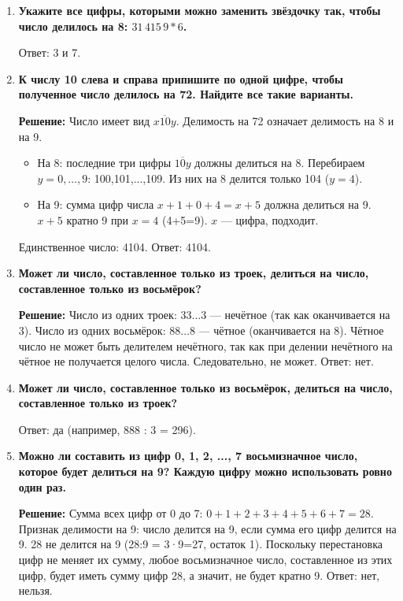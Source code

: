 \documentclass[12pt, a4paper]{article}
\begin{document}
\begin{enumerate}[label=\arabic*., wide=0pt, leftmargin=*]
\item \textbf{Укажите все цифры, которыми можно заменить звёздочку так, чтобы число делилось на 8: \(31\,415\,9\ast 6\).}

Ответ: 3 и 7.

\item \textbf{К числу 10 слева и справа припишите по одной цифре, чтобы полученное число делилось на 72. Найдите все такие варианты.}

\textbf{Решение:}
Число имеет вид \(\overline{x10y}\). Делимость на 72 означает делимость на 8 и на 9.
\begin{itemize}
\item На 8: последние три цифры \(\overline{10y}\) должны делиться на 8. Перебираем \(y=0,\dots,9\): 100,101,...,109. Из них на 8 делится только 104 (\(y=4\)).
\item На 9: сумма цифр числа \(x+1+0+4 = x+5\) должна делиться на 9. \(x+5\) кратно 9 при \(x=4\) (4+5=9). \(x\) — цифра, подходит.
\end{itemize}
Единственное число: 4104. 
Ответ: 4104.

\item \textbf{Может ли число, составленное только из троек, делиться на число, составленное только из восьмёрок?}

\textbf{Решение:}
Число из одних троек: \(33\ldots3\) — нечётное (так как оканчивается на 3). Число из одних восьмёрок: \(88\ldots8\) — чётное (оканчивается на 8). Чётное число не может быть делителем нечётного, так как при делении нечётного на чётное не получается целого числа. Следовательно, не может. 
Ответ: нет.

\item \textbf{Может ли число, составленное только из восьмёрок, делиться на число, составленное только из троек?}

Ответ: да (например, 888 : 3 = 296).

\item \textbf{Можно ли составить из цифр 0, 1, 2, ..., 7 восьмизначное число, которое будет делиться на 9? Каждую цифру можно использовать ровно один раз.}

\textbf{Решение:}
Сумма всех цифр от 0 до 7: \(0+1+2+3+4+5+6+7 = 28\). Признак делимости на 9: число делится на 9, если сумма его цифр делится на 9. 28 не делится на 9 (28:9 = 3·9=27, остаток 1). Поскольку перестановка цифр не меняет их сумму, любое восьмизначное число, составленное из этих цифр, будет иметь сумму цифр 28, а значит, не будет кратно 9. 
Ответ: нет, нельзя.

\end{enumerate}
\end{document}
